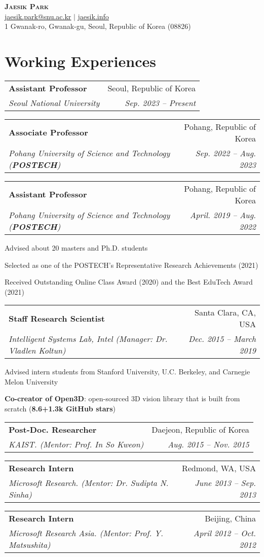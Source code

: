 \documentclass[letterpaper,11pt]{article}
\makeatletter
\newcommand{\resumeItem}[1]{
  \small{
  \item{#1 \vspace{-2pt}}
  }
}
\newcommand{\resumeSubheading}[4]{
  \vspace{-2pt}\item
    \begin{tabular*}{0.97\textwidth}[t]{l@{\extracolsep{\fill}}r}
      \textbf{#1} & #2 \\
      \textit{\small#3} & \textit{\small #4} \\
    \end{tabular*}\vspace{-7pt}
}
\newcommand{\resumeSubHeadingListStart}{\begin{itemize}[leftmargin=0.15in, label={}]}
\newcommand{\resumeSubHeadingListEnd}{\end{itemize}}
\newcommand{\resumeItemListStart}{\begin{itemize}}
\newcommand{\resumeItemListEnd}{\end{itemize}\vspace{-5pt}}
\makeatother
\begin{document}
\begin{center}
    \textbf{\Huge \scshape Jaesik Park} \\ \vspace{3pt}
    \small \href{mailto:jaesik.park@snu.ac.kr}{\underline{jaesik.park@snu.ac.kr}} $|$ 
    \href{http://jaesik.info}{\underline{jaesik.info}}\\
    \footnotesize{1 Gwanak-ro, Gwanak-gu, Seoul, Republic of Korea (08826)}
\end{center}

\section{Working Experiences}
  \resumeSubHeadingListStart
    \resumeSubheading
      {Assistant Professor}{Seoul, Republic of Korea}
      {Seoul National University}{Sep. 2023 -- Present}
    \resumeSubheading
      {Associate Professor}{Pohang, Republic of Korea}
      {Pohang University of Science and Technology \textnormal{(\textbf{POSTECH})}}{Sep. 2022 -- Aug. 2023}
    \resumeSubheading
      {Assistant Professor}{Pohang, Republic of Korea}
      {Pohang University of Science and Technology \textnormal{(\textbf{POSTECH})}}{April. 2019 -- Aug. 2022}
      \resumeItemListStart
        \resumeItem{Advised about 20 masters and Ph.D. students}
        \resumeItem{Selected as one of the POSTECH's Representative Research Achievements (2021)}
        \resumeItem{Received Outstanding Online Class Award (2020) and the Best EduTech Award (2021)}
      \resumeItemListEnd
    \resumeSubheading
      {Staff Research Scientist}{Santa Clara, CA, USA}
      {Intelligent Systems Lab, Intel (Manager: Dr. Vladlen Koltun)}{Dec. 2015 -- March 2019}
        \resumeItemListStart
          \resumeItem{Advised intern students from Stanford University, U.C. Berkeley, and Carnegie Melon University}
          \resumeItem{\textbf{Co-creator of Open3D}: open-sourced 3D vision library that is built from scratch (\textbf{8.6+1.3k GitHub stars})}
        \resumeItemListEnd
    \resumeSubheading
      {Post-Doc. Researcher}{Daejeon, Republic of Korea}
      {KAIST. (Mentor: Prof. In So Kweon)}{Aug. 2015 -- Nov. 2015}
    \resumeSubheading
      {Research Intern}{Redmond, WA, USA}
      {Microsoft Research. (Mentor: Dr. Sudipta N. Sinha)}{June 2013 -- Sep. 2013}
    \resumeSubheading
      {Research Intern}{Beijing, China}
      {Microsoft Research Asia. (Mentor: Prof. Y. Matsushita)}{April 2012 -- Oct. 2012}     
  \resumeSubHeadingListEnd
\end{document}
